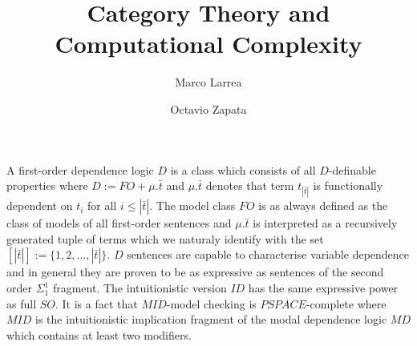  \usepackage{amsmath, amsthm, amssymb}
 \usepackage[full]{complexity}



\title{Category Theory and \\ Computational Complexity}
\author{Marco Larrea \and Octavio Zapata}


\maketitle
A first-order dependence logic $D$ is a class which consists of all $D$-definable properties where $D := FO + \mu.\bar{t}$ and $\mu.\bar{t}$ denotes that term $t_{|\bar{t}|}$ is functionally dependent on $t_{i}$ for all $i\leq |\bar{t}|$. The model class $FO$ is as always defined as the class of models of all first-order sentences and $\mu.\bar{t}$ is interpreted as a recursively generated tuple of terms which we naturaly identify with the set $[|\bar{t}|] := \{1,2,\dots,|\bar{t}|\}$. $D$ sentences are capable to characterise variable dependence and in general they are proven to be as expressive as sentences of the second order $\Sigma_1^1$ fragment. The intuitionistic version $ID$ has the same expressive power as full $SO$. It is a fact that $MID$-model checking is $PSPACE$-complete where $MID$ is the intuitionistic implication fragment of the modal dependence logic $MD$ which contains at least two modifiers. 

\nocite{*}





